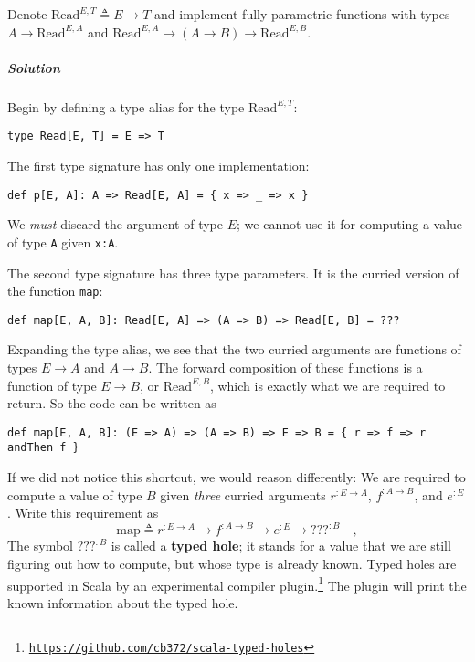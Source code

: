 Denote $\text{Read}^{E,T}\triangleq E\rightarrow T$ and implement
fully parametric functions with types $A\rightarrow\text{Read}^{E,A}$
and $\text{Read}^{E,A}\rightarrow(A\rightarrow B)\rightarrow\text{Read}^{E,B}$.

\subparagraph{Solution}

Begin by defining a type alias for the type $\text{Read}^{E,T}$:
\begin{lstlisting}
type Read[E, T] = E => T
\end{lstlisting}
The first type signature has only one implementation:
\begin{lstlisting}
def p[E, A]: A => Read[E, A] = { x => _ => x }
\end{lstlisting}
We \emph{must} discard the argument of type $E$; we cannot use it
for computing a value of type \lstinline!A! given \lstinline!x:A!.

The second type signature has three type parameters. It is the curried
version of the function \lstinline!map!:
\begin{lstlisting}
def map[E, A, B]: Read[E, A] => (A => B) => Read[E, B] = ???
\end{lstlisting}
Expanding the type alias, we see that the two curried arguments are
functions of types $E\rightarrow A$ and $A\rightarrow B$. The forward
composition of these functions is a function of type $E\rightarrow B$,
or $\text{Read}^{E,B}$, which is exactly what we are required to
return. So the code can be written as

\begin{lstlisting}
def map[E, A, B]: (E => A) => (A => B) => E => B = { r => f => r andThen f }
\end{lstlisting}
If we did not notice this shortcut, we would reason differently: We
are required to compute a value of type $B$ given \emph{three} curried
arguments $r^{:E\rightarrow A}$, $f^{:A\rightarrow B}$, and $e^{:E}$.
Write this requirement as
\[
\text{map}\triangleq r^{:E\rightarrow A}\rightarrow f^{:A\rightarrow B}\rightarrow e^{:E}\rightarrow???^{:B}\quad,
\]
The symbol $\text{???}^{:B}$ is called a \textbf{typed
hole}; it stands for a value that we are still figuring out how to
compute, but whose type is already known. Typed holes are supported
in Scala by an experimental compiler plugin.\footnote{\texttt{\href{https://github.com/cb372/scala-typed-holes}{https://github.com/cb372/scala-typed-holes}}}
The plugin will print the known information about the typed hole.

